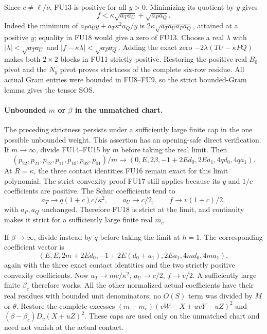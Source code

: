 Since $c\ne\ell/\nu$, FU13 is positive for all $y>0$.
Minimizing its quotient by $y$ gives
\[
 f<\kappa\sqrt{a_Ta_U}+\sqrt{a_Pa_Q}.
 \tag{FU18}
\]
Indeed the minimum of
$a_Pa_Uy+a_T\kappa^2a_Q/y$ is
$2\kappa\sqrt{a_Ta_Ua_Pa_Q}$, attained at a positive $y$;
equality in FU18 would give a zero of FU13. Choose a real
$\lambda$ with $|\lambda|<\sqrt{a_Ta_U}$ and
$|f-\kappa\lambda|<\sqrt{a_Pa_Q}$. Adding the exact zero
$-2\lambda(TU-\kappa PQ)$ makes both $2\times2$ blocks in
FU11 strictly positive. Restoring the positive real $B_0$ pivot
and the $N_y$ pivot proves strictness of the complete six-row
residue. All actual Gram entries were bounded in FU8--FU9, so
the strict bounded-Gram lemma gives the tensor SOS.

\paragraph{Unbounded $m$ or $\beta$ in the unmatched chart.}
The preceding strictness persists under a sufficiently large
finite cap in the one possible unbounded weight. This assertion
has an opening-safe direct verification. If $m\to\infty$,
divide FU14--FU15 by $m$ before taking the real limit. Then
\[
 (p_{22},p_{21},p_{12},p_{11},p_{10},p_{02},p_{01})/m
 \longrightarrow
 (0,E,2\beta,-1+2Ed_0,2Ea_1,4qd_0,4qa_1).
 \tag{FU19}
\]
At $R=\kappa$, the three contact identities FU16 remain exact
for this limit polynomial. The strict convexity proof FU17 still
applies because its $y$ and $1/c$ coefficients are positive.
The Schur coefficients tend to
\[
 a_T\to q(1+c)c/\kappa^2,\qquad
 a_U\to c/2,\qquad f\to v(1+c)/2,
 \tag{FU20}
\]
with $a_P,a_Q$ unchanged. Therefore FU18 is strict at the limit,
and continuity makes it strict for a sufficiently large finite
real $m_c$.

If $\beta\to\infty$, divide instead by $q$ before taking the
limit at $h=1$. The corresponding coefficient vector is
\[
 (E,E,2m+2Ed_0,-1+2E(d_0+a_1),
                         2Ea_1,4md_0,4ma_1),
 \tag{FU21}
\]
again with the three exact contact identities and the two strictly
positive convexity coefficients. Now
$a_T\to mc/\kappa^2$, $a_U\to c/2$, $f\to v/2$.
A sufficiently large finite $\beta_c$ therefore works.
All the other normalized actual coefficients have their real
residues with bounded unit denominators; no $O(S)$ term was
divided by $M$ or $\theta$. Restore the complete excesses
$(m-m_c)(vW-X+uvY-uZ)^2$ and
$(\beta-\beta_c)D_v(X+uZ)^2$. These caps are used only on the
unmatched chart and need not vanish at the actual contact.

